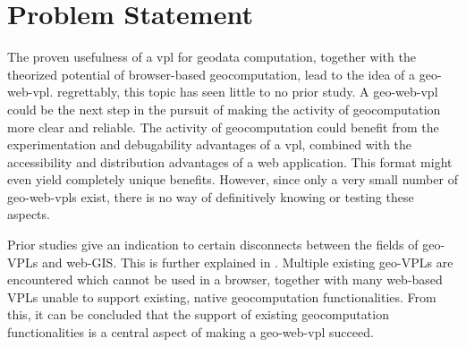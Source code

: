 



\section{Problem Statement}

The proven usefulness of a vpl for geodata computation, together with the theorized potential of browser-based geocomputation, lead to the idea of a \ac{geo-web-vpl}. 
regrettably, this topic has seen little to no prior study. 
A \ac{geo-web-vpl} could be the next step in the pursuit of making the activity of geocomputation more clear and reliable.
The activity of geocomputation could benefit from the experimentation and debugability advantages of a \ac{vpl}, combined with the accessibility and distribution advantages of a web application.
This format might even yield completely unique benefits.
However, since only a very small number of geo-web-vpls exist, there is no way of definitively knowing or testing these aspects. 

Prior studies give an indication to certain disconnects between the fields of geo-VPLs and web-GIS. This is further explained in .
Multiple existing geo-VPLs are encountered which cannot be used in a browser, together with many web-based VPLs unable to support existing, native geocomputation functionalities. From this, it can be concluded that the support of existing geocomputation functionalities is a central aspect of making a geo-web-vpl succeed. 

